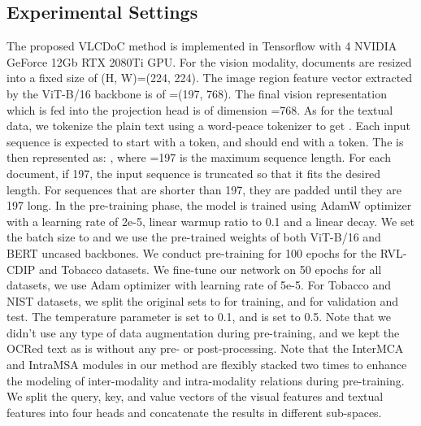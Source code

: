 \documentclass[preprint,review,12pt]{elsarticle}
\begin{document}
\subsection{Experimental Settings}
The proposed VLCDoC method is implemented in Tensorflow with 4 NVIDIA GeForce 12Gb RTX 2080Ti GPU. For the vision modality, documents are resized into a fixed size of (H, W)=(224, 224). The image region feature vector extracted by the ViT-B/16 backbone is of =(197, 768). The final vision representation which is fed into the projection head is of dimension =768. As for the textual data, we tokenize the plain text  using a word-peace tokenizer to get . Each input sequence is expected to start with a  token, and should end with a  token. The  is then represented as: , where =197 is the maximum sequence length. For each document, if 197, the input sequence is truncated so that it fits the desired length. For sequences that are shorter than 197, they are padded until they are 197 long. In the pre-training phase, the model is trained using AdamW optimizer with a learning rate of 2e-5, linear warmup ratio to 0.1 and a linear decay. We set the batch size to  and we use the pre-trained weights of both ViT-B/16 and BERT uncased backbones. We conduct pre-training for 100 epochs for the RVL-CDIP and Tobacco datasets. We fine-tune our network on 50 epochs for all datasets, we use Adam optimizer with learning rate of 5e-5. 
For Tobacco and NIST datasets, we split the original sets to  for training, and  for validation and test. The temperature parameter  is set to 0.1, and  is set to 0.5. Note that we didn't use any type of data augmentation during pre-training, and we kept the OCRed text as is without any pre- or post-processing. Note that the InterMCA and IntraMSA modules in our method are flexibly stacked two times to enhance the modeling of inter-modality and intra-modality relations during pre-training. We split the query, key, and value vectors of the visual features and textual features into four heads and concatenate the results in different sub-spaces.
\end{document}
